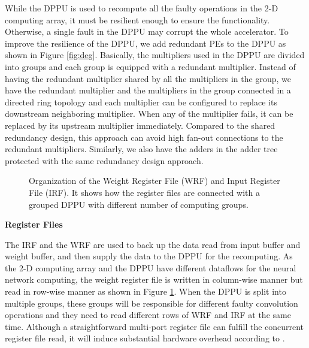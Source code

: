 While the DPPU is used to recompute all the faulty operations in the 2-D computing array, it must be resilient enough to ensure the functionality. Otherwise, a single fault in the DPPU may corrupt the whole accelerator. To improve the resilience of the DPPU, we add redundant PEs to the DPPU as shown in Figure \ref{fig:deg}. Basically, the multipliers used in the DPPU are divided into groups and each group is equipped with a redundant multiplier. Instead of having the redundant multiplier shared by all the multipliers in the group, we have the redundant multiplier and the multipliers in the group connected in a directed ring topology and each multiplier can be configured to replace its downstream neighboring multiplier. When any of the multiplier fails, it can be replaced by its upstream multiplier immediately. Compared to the shared redundancy design, this approach can avoid high fan-out connections to the redundant multipliers. Similarly, we also have the adders in the adder tree protected with the same redundancy design approach. 

\begin{figure}
    \setlength{\abovecaptionskip}{0pt}
    \setlength{\belowcaptionskip}{0pt}
            \caption{Organization of the Weight Register File (WRF) and Input Register File (IRF). It shows how the register files are connected with a grouped DPPU with different number of computing groups.}
            \label{fig:reg}
            \vspace{-1em}
\end{figure}




\textbf{Register Files}

The IRF and the WRF are used to back up the data read from input buffer and weight buffer, and then supply the data to the DPPU for the recomputing. As the 2-D computing array and the DPPU have different dataflows for the neural network computing, the weight register file is written in column-wise manner but read in row-wise manner as shown in Figure \ref{fig:reg}. When the DPPU is split into multiple groups, these groups will be responsible for different faulty convolution operations and they need to read different rows of WRF and IRF at the same time. Although a straightforward multi-port register file can fulfill the concurrent register file read, it will induce substantial hardware overhead according to \cite{Energy2003Aneesh,A2012Chang}. 

